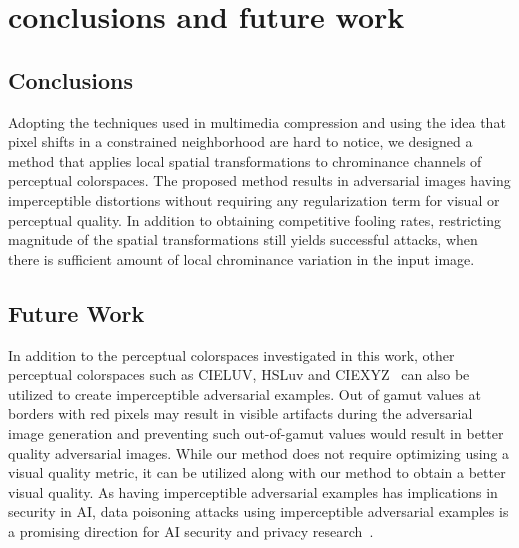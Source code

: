 \chapter{conclusions and future work}
\label{chp:6_conclusion}
\section{Conclusions}
Adopting the techniques used in multimedia compression and using the idea that pixel shifts in a constrained neighborhood are hard to notice, we designed a method that applies local spatial transformations to chrominance channels of perceptual colorspaces. The proposed method results in adversarial images having imperceptible distortions without requiring any regularization term for visual or perceptual quality. In addition to obtaining competitive fooling rates, restricting magnitude of the spatial transformations still yields successful attacks, when there is sufficient amount of local chrominance variation in the input image.

\section{Future Work}
In addition to the perceptual colorspaces investigated in this work, other perceptual colorspaces such as CIELUV, HSLuv and CIEXYZ~\cite{schanda2007colorimetry} can also be utilized to create imperceptible adversarial examples. Out of gamut values at borders with red pixels may result in visible artifacts during the adversarial image generation and preventing such out-of-gamut values would result in better quality adversarial images. While our method does not require optimizing using a visual quality metric, it can be utilized along with our method to obtain a better visual quality.
As having imperceptible adversarial examples has implications in security in AI, data poisoning attacks using imperceptible adversarial examples is a promising direction for AI security and privacy research~\cite{carlini2017towards,ilyas2019adversarial}. 
